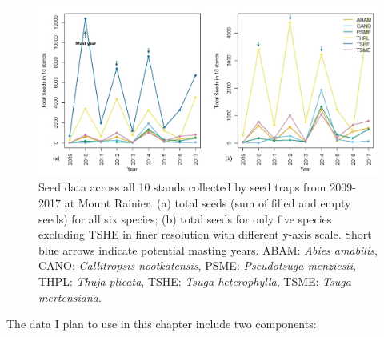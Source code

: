 \documentclass[11pt,letter]{article}
\begin{document}
\pagebreak
\begin{figure}[!h]
	\centering
	\includegraphics[width=1\linewidth]{Seed1.jpg}
	\caption{Seed data across all 10 stands collected by seed traps from 2009-2017 at Mount Rainier. (a) total seeds (sum of filled and empty seeds) for all six species; (b) total seeds for only five species excluding TSHE in finer resolution with different y-axis scale. Short blue arrows indicate potential masting years. ABAM: \textit{Abies amabilis}, CANO:  \textit{Callitropsis nootkatensis}, PSME: \textit{Pseudotsuga menziesii}, THPL: \textit{Thuja plicata}, TSHE: \textit{Tsuga heterophylla}, TSME: \textit{Tsuga mertensiana}.}
	\label{fig:seed}
\end{figure}
The data I plan to use in this chapter include two components:
\end{document}
